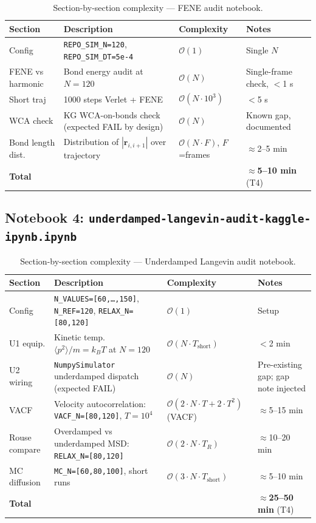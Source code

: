 \documentclass[12pt,a4paper]{article}
\newcommand{\Obig}[1]{\mathcal{O}\!\left(#1\right)}
\newcommand{\code}[1]{\texttt{#1}}
\begin{document}
\begin{table}[h]
\centering
\caption{Section-by-section complexity — FENE audit notebook.}
\label{tab:nb3}
\begin{tabular}{p{1.2cm}p{4.5cm}p{3cm}p{4cm}}
\toprule
Section & Description & Complexity & Notes \\
\midrule
Config  & \code{REPO\_SIM\_N=120}, \code{REPO\_SIM\_DT=5e-4}
        & $\Obig{1}$ & Single $N$ \\
FENE vs harmonic & Bond energy audit at $N=120$
        & $\Obig{N}$   & Single-frame check, $<$1 s \\
Short traj & 1000 steps Verlet + FENE
        & $\Obig{N\cdot 10^3}$ & $<$5 s \\
WCA check & KG WCA-on-bonds check (expected FAIL by design)
        & $\Obig{N}$   & Known gap, documented \\
Bond length dist. & Distribution of $|\mathbf{r}_{i,i+1}|$ over trajectory
        & $\Obig{N\cdot F}$, $F$=frames
        & $\approx$2--5 min \\
\midrule
\textbf{Total} & & & $\approx$\textbf{5--10 min} (T4) \\
\bottomrule
\end{tabular}
\end{table}

\subsection{Notebook 4: \texttt{underdamped-langevin-audit-kaggle-ipynb.ipynb}}

\begin{table}[h]
\centering
\caption{Section-by-section complexity — Underdamped Langevin audit notebook.}
\label{tab:nb4}
\begin{tabular}{p{1.2cm}p{4.5cm}p{3cm}p{4cm}}
\toprule
Section & Description & Complexity & Notes \\
\midrule
Config  & \code{N\_VALUES=[60,\ldots,150]}, \code{N\_REF=120}, \code{RELAX\_N=[80,120]}
        & $\Obig{1}$ & Setup \\
U1 equip. & Kinetic temp.\ $\langle p^2\rangle/m = k_BT$ at $N=120$
           & $\Obig{N\cdot T_\text{short}}$
           & $<$2 min \\
U2 wiring & \code{NumpySimulator} underdamped dispatch (expected FAIL)
           & $\Obig{N}$
           & Pre-existing gap; gap note injected \\
VACF   & Velocity autocorrelation: \code{VACF\_N=[80,120]}, $T=10^4$
        & $\Obig{2\cdot N\cdot T + 2\cdot T^2}$ (VACF)
        & $\approx$5--15 min \\
Rouse compare & Overdamped vs underdamped MSD: \code{RELAX\_N=[80,120]}
              & $\Obig{2\cdot N\cdot T_R}$
              & $\approx$10--20 min \\
MC diffusion & \code{MC\_N=[60,80,100]}, short runs
             & $\Obig{3\cdot N\cdot T_\text{short}}$
             & $\approx$5--10 min \\
\midrule
\textbf{Total} & & & $\approx$\textbf{25--50 min} (T4) \\
\bottomrule
\end{tabular}
\end{table}
\end{document}
